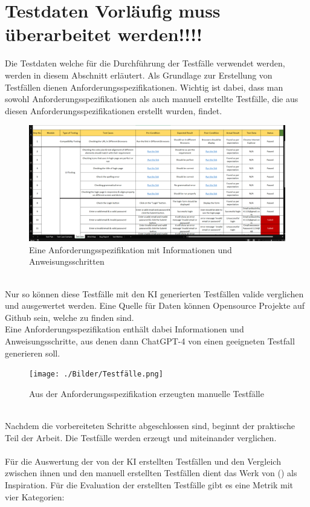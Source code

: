 \documentclass[12pt,toc=bib,toc=listof]{scrreprt}
\begin{document}
\section{Testdaten Vorläufig muss überarbeitet werden!!!!} %
\label{sec:testdaten}
Die Testdaten welche für die Durchführung der Testfälle verwendet werden, werden in diesem Abschnitt erläutert.
Als Grundlage zur Erstellung von Testfällen dienen Anforderungsspezifikationen. Wichtig ist dabei, dass man sowohl Anforderungsspezifikationen als auch manuell erstellte Testfälle, die aus diesen Anforderungsspezifikationen erstellt wurden, findet.\\
\begin{figure} [h!]
    \centering
    \includegraphics[width=1\linewidth]{./Bilder/Testspezifikationen.png}
    \caption{Eine Anforderungsspezifikation mit Informationen und Anweisungsschritten}
\end{figure}
\\
Nur so können diese Testfälle mit den KI generierten Testfällen valide verglichen und ausgewertet werden. Eine Quelle für Daten können Opensource Projekte auf Github sein, welche zu finden sind.\\
\newpage
\noindent Eine Anforderungsspezifikation enthält dabei Informationen und Anweisungsschritte, aus denen dann ChatGPT-4 von \textcite{OpenAI2025} einen geeigneten Testfall generieren soll.\\
\begin{figure} [h!]
    \centering
    \texttt{[image: ./Bilder/Testfälle.png]}
    \caption{Aus der Anforderungsspezifikation erzeugten manuelle Testfälle}
\end{figure}
\\
Nachdem die vorbereiteten Schritte abgeschlossen sind, beginnt der praktische Teil der Arbeit. Die Testfälle werden erzeugt und miteinander verglichen.\\
\\
Für die Auswertung der von der KI erstellten Testfällen und den Vergleich zwischen ihnen und den manuell erstellten Testfällen dient das Werk von (\cite{Wang2024}) als Inspiration. Für die Evaluation der erstellten Testfälle gibt es eine Metrik mit vier Kategorien:\\
\end{document}
